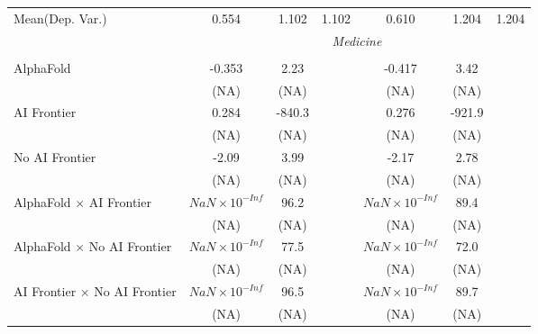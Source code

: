 \begin{tabular}{lcccccc}
Mean(Dep. Var.) & 0.554 & 1.102 & 1.102 & 0.610 & 1.204 & 1.204 \\
 & \multicolumn{6}{c}{\textit{Medicine}} \\ \\
   AlphaFold                                                                  & -0.353                 & 2.23   &        & -0.417                 & 3.42   &   \\   
                                                                              & (NA)                   & (NA)   &        & (NA)                   & (NA)   &   \\   
   AI Frontier                                                                & 0.284                  & -840.3 &        & 0.276                  & -921.9 &   \\   
                                                                              & (NA)                   & (NA)   &        & (NA)                   & (NA)   &   \\   
   No AI Frontier                                                             & -2.09                  & 3.99   &        & -2.17                  & 2.78   &   \\   
                                                                              & (NA)                   & (NA)   &        & (NA)                   & (NA)   &   \\   
   AlphaFold $\times$ AI Frontier                                             & $NaN\times 10^{-Inf}$  & 96.2   &        & $NaN\times 10^{-Inf}$  & 89.4   &   \\   
                                                                              & (NA)                   & (NA)   &        & (NA)                   & (NA)   &   \\   
   AlphaFold $\times$ No AI Frontier                                          & $NaN\times 10^{-Inf}$  & 77.5   &        & $NaN\times 10^{-Inf}$  & 72.0   &   \\   
                                                                              & (NA)                   & (NA)   &        & (NA)                   & (NA)   &   \\   
   AI Frontier $\times$ No AI Frontier                                        & $NaN\times 10^{-Inf}$  & 96.5   &        & $NaN\times 10^{-Inf}$  & 89.7   &   \\   
                                                                              & (NA)                   & (NA)   &        & (NA)                   & (NA)   &   \\   

\end{tabular}
